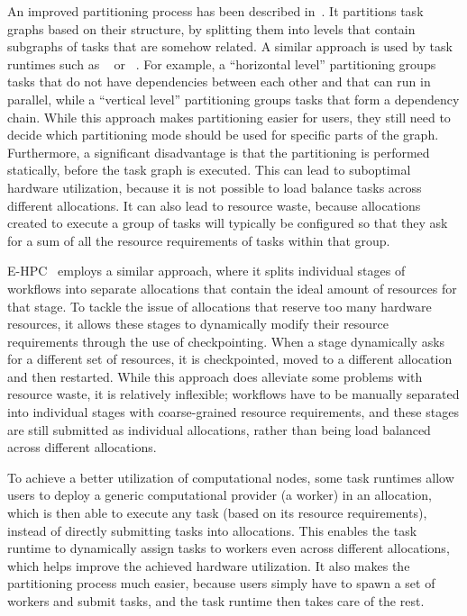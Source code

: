 An improved partitioning process has been described in~\cite{zhang_batch_scheduling}. It partitions task
graphs based on their structure, by splitting them into levels that contain subgraphs of tasks that
are somehow related. A similar approach is used by task runtimes such as
\pegasus{}~\cite{pegasus} or \autosubmit~\cite{autosubmit}. For
example, a ``horizontal level'' partitioning groups tasks that do not have dependencies between
each other and that can run in parallel, while a ``vertical level'' partitioning groups tasks that
form a dependency chain. While this approach makes partitioning easier for users, they still need
to decide which partitioning mode should be used for specific parts of the graph. Furthermore, a
significant disadvantage is that the partitioning is performed statically, before the task graph is
executed. This can lead to suboptimal hardware utilization, because it is not possible to load
balance tasks across different allocations. It can also lead to resource waste, because allocations
created to execute a group of tasks will typically be configured so that they ask for a sum of all
the resource requirements of tasks within that group.

\textsc{E-HPC}~\cite{ehpc} employs a similar approach, where it splits
individual stages of workflows into separate allocations that contain the ideal amount of resources
for that stage. To tackle the issue of allocations that reserve too many hardware resources, it
allows these stages to dynamically modify their resource requirements through the use of
checkpointing. When a stage dynamically asks for a different set of resources, it is checkpointed,
moved to a different allocation and then restarted. While this approach does alleviate some
problems with resource waste, it is relatively inflexible; workflows have to be manually separated
into individual stages with coarse-grained resource requirements, and these stages are still
submitted as individual allocations, rather than being load balanced across different allocations.

To achieve a better utilization of computational nodes, some task runtimes allow users to deploy a
generic computational provider (a worker) in an allocation, which is then able to execute any task
(based on its resource requirements), instead of directly submitting tasks into allocations. This
enables the task runtime to dynamically assign tasks to workers even across different allocations,
which helps improve the achieved hardware utilization. It also makes the partitioning process much
easier, because users simply have to spawn a set of workers and submit tasks, and the task runtime
then takes care of the rest.

